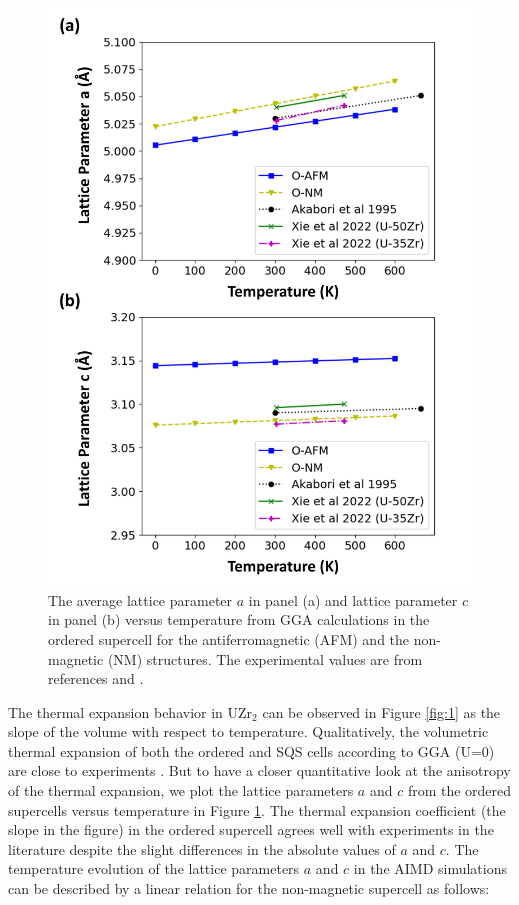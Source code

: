 \documentclass[preprint,12pt]{elsarticle}
\begin{document}
\begin{figure}[h!]
     \centering
    \includegraphics[scale=0.2]{cell_parameters.jpg}
    \caption{The average lattice parameter $a$ in panel (a) and lattice parameter $c$ in panel (b) versus temperature from GGA calculations in the ordered supercell for the antiferromagnetic (AFM) and the non-magnetic (NM) structures. The experimental values are from references  \cite{akabori_lattice_1995} and \cite{xie_phase_2022}.
    \label{fig lat_par}}
\end{figure}

The thermal expansion behavior in UZr$_2$ can be observed in Figure \ref{fig:1} as the slope of the volume with respect to temperature. Qualitatively, the volumetric thermal expansion of both the ordered and SQS cells according to GGA (U=0) are close to experiments \cite{akabori_lattice_1995, xie_phase_2022}. But to have a closer quantitative look at the anisotropy of the thermal expansion, we plot the lattice parameters $a$ and $c$ from the ordered supercells versus temperature in Figure \ref{fig lat_par}. The thermal expansion coefficient (the slope in the figure) in the ordered supercell agrees well with experiments in the literature despite the slight differences in the absolute values of $a$ and $c$. The temperature evolution of the lattice parameters $a$ and $c$
in the AIMD simulations can be described by a linear relation for the non-magnetic supercell as follows: 
\end{document}
